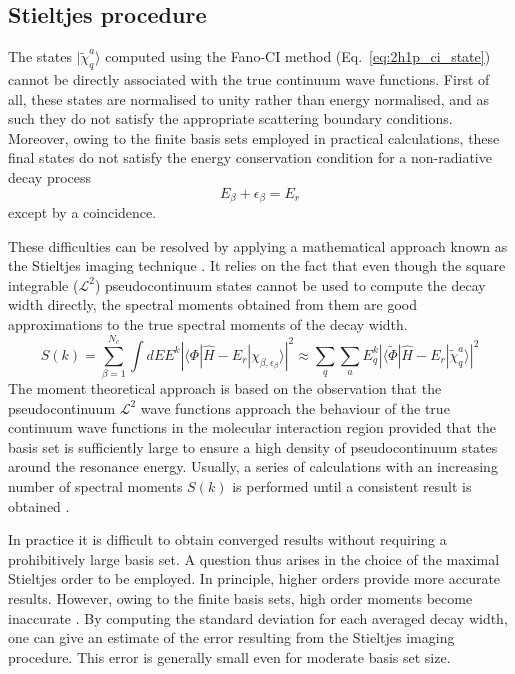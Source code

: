 \documentclass[a4paper, 10 pt]{report}
\newcommand{\ket}[1]{\ensuremath{| #1 \rangle}}
\newcommand{\dirint}[3]{\ensuremath{\langle #1|#2|#3\rangle}}
\begin{document}
\subsection{Stieltjes procedure}

The states \ket{\tilde{\chi}_{q}^{a}} computed using the Fano-CI method
(Eq.\ \eqref{eq:2h1p_ci_state}) cannot be directly associated with the true 
continuum wave functions. First of all, these states are normalised to unity 
rather than energy normalised, and as such they do not satisfy the appropriate 
scattering boundary conditions. Moreover, owing to the finite basis sets 
employed in practical calculations, these final states do not satisfy the energy 
conservation condition for a non-radiative decay process
%
\begin{equation}
E_{\beta} + \epsilon_{\beta} = E_{r}
\end{equation}
%
except by a coincidence.


These difficulties can be resolved by applying a mathematical approach known as 
the Stieltjes imaging technique \cite{Hazi79,Langhoff79,Plathe89:696}. It 
relies on the fact that even though the square integrable ($\mathcal{L}^{2}$) 
pseudocontinuum states cannot be used to compute the decay width directly, the 
spectral moments obtained from them are good approximations to the true spectral 
moments of the decay width.
%
\begin{equation}
S(k) = \sum_{\beta = 1}^{N_{c}} \int dE E^{k} |\dirint{\Phi}{\hat{H}-E_{r}}{\chi_{\beta, \epsilon_{\beta}}}|^{2}
\approx \sum_{q}\sum_{a} E_{q}^{k} |\dirint{\tilde{\Phi}}{\hat{H}-E_{r}}{\tilde{\chi}_{q}^{a}}|^{2}
\end{equation}
%
The moment theoretical approach is based on the observation that the 
pseudocontinuum $\mathcal{L}^{2}$ wave functions approach the behaviour of the 
true continuum wave functions in the molecular interaction region provided that 
the basis set is sufficiently large to ensure a high density of pseudocontinuum 
states around the resonance energy. Usually, a series of calculations with an 
increasing number of spectral moments $S(k)$ is performed until a consistent 
result is obtained \cite{Hazi79,Langhoff79,Plathe89:696,Averbukh05:204107}.


In practice it is difficult to obtain converged results without requiring a 
prohibitively large basis set. A question thus arises in the choice of the 
maximal Stieltjes order to be employed. In principle, higher orders provide more 
accurate results. However, owing to the finite basis sets, high order moments 
become inaccurate \cite{Plathe89:696}.  By computing the standard deviation 
for each averaged decay width, one can give an 
estimate of the error resulting from the Stieltjes imaging procedure. This error is generally small even for moderate basis set size.
\end{document}
